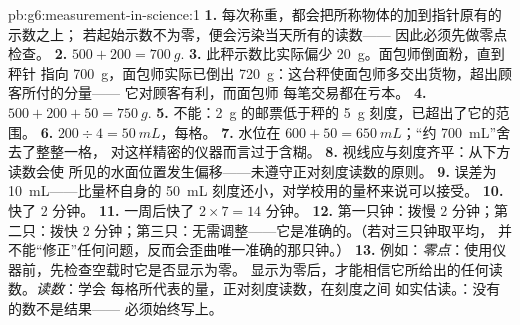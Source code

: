\begin{solution}{pb:g6:measurement-in-science:1}
\textbf{1.} 每次称重，都会把所称物体的加到指针原有的示数之上；
若起始示数不为零，便会污染当天所有的读数——
因此必须先做零点检查。
\textbf{2.} $500 + 200 = \qty{700}{g}$.
\textbf{3.} 此秤示数比实际偏少 \qty{20}{g}。面包师倒面粉，直到秤针
指向 \qty{700}{g}，面包师实际已倒出
\qty{720}{g}：这台秤使面包师多交出货物，超出顾客所付的分量——
它对顾客有利，而面包师
每笔交易都在亏本。
\textbf{4.} $500 + 200 + 50 = \qty{750}{g}$.
\textbf{5.} 不能：\qty{2}{g} 的邮票低于秤的
\qty{5}{g} 刻度，已超出了它的范围。
\textbf{6.} $200 \div 4 = \qty{50}{mL}$，每格。
\textbf{7.} 水位在 $600 + 50 = \qty{650}{mL}$；“约
\qty{700}{mL}”舍去了整整一格，
对这样精密的仪器而言过于含糊。
\textbf{8.} 视线应与刻度齐平：从下方读数会使
所见的水面位置发生偏移——未遵守正对刻度读数的原则。
\textbf{9.} 误差为 \qty{10}{mL}——比量杯自身的
\qty{50}{mL} 刻度还小，对学校用的量杯来说可以接受。
\textbf{10.} 快了 $2$ 分钟。
\textbf{11.} 一周后快了 $2 \times 7 = 14$ 分钟。
\textbf{12.} 第一只钟：拨慢 $2$ 分钟；第二只：拨快 $2$
分钟；第三只：无需调整——它是准确的。（若对三只钟取平均，
并不能“修正”任何问题，反而会歪曲唯一准确的那只钟。）
\textbf{13.} 例如：\emph{零点}：使用仪器前，先检查空载时它是否显示为零。
显示为零后，才能相信它所给出的任何读数。\emph{读数}：学会
每格所代表的量，正对刻度读数，在刻度之间
如实估读。\emph{}：没有的数不是结果——
必须始终写上。
\end{solution}
